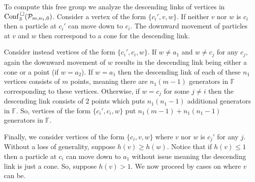 To compute this free group we analyze the descending links of vertices in \(\mathrm{Conf}^{\,\square}_3(\mathcal{P}_{m,n_1,0})\).
Consider a vertex of the form \(\{c_i', v, w\}\).
If neither \(v\) nor \(w\) is \(c_i\)
then a particle at \(c_i'\) can move down to \(c_i\).
The downward movement of particles at \(v\) and \(w\) then correspond to a cone for the descending link.

Consider instead vertices of the form \(\{c_i', c_i, w\}\).
If \(w \neq a_1\) and \(w \neq c_j\) for any \(c_j\),
again the downward movement of \(w\) results in the descending link being either a cone or a point (if \(w = a_2\)).
If \(w = a_1\) then the descending link of each of these \(n_1\) vertices consists of \(m\) points,
meaning there are \(n_1 (m - 1)\) generators in \(\mathbb{F}\) corresponding to these vertices.
Otherwise, if \(w = c_j\) for some \(j \neq i\) then the descending link consists of \(2\) points which puts \(n_1 (n_1 - 1)\) additional generators in \(\mathbb{F}\).
So, vertices of the form \(\{c_i', c_i, w\}\) put \(n_1 (m-1) + n_1 (n_1 - 1)\) generators in \(\mathbb{F}\).

Finally, we consider vertices of the form \(\{c_i, v, w\}\) where \(v\) nor \(w\) is \(c_j'\) for any \(j\).
Without a loss of generality, suppose \(h(v) \ge h(w)\).
Notice that if \(h(v) \le 1\) then a particle at \(c_i\) can move down to \(a_1\) without issue meaning the descending link is just a cone.
So, suppose \(h(v) > 1\).
We now proceed by cases on where \(v\) can be.

